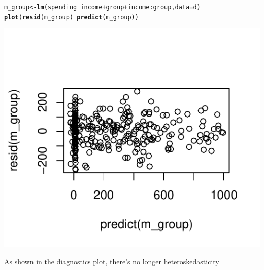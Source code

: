 \documentclass{article}\usepackage[]{graphicx}\usepackage[]{color}
\makeatletter
\def\maxwidth{ %
  \ifdim\Gin@nat@width>\linewidth
    \linewidth
  \else
    \Gin@nat@width
  \fi
}
\newcommand{\hlopt}[1]{\textcolor[rgb]{0,0,0}{#1}}%
\newcommand{\hlstd}[1]{\textcolor[rgb]{0.345,0.345,0.345}{#1}}%
\newcommand{\hlkwb}[1]{\textcolor[rgb]{0.69,0.353,0.396}{#1}}%
\newcommand{\hlkwc}[1]{\textcolor[rgb]{0.333,0.667,0.333}{#1}}%
\newcommand{\hlkwd}[1]{\textcolor[rgb]{0.737,0.353,0.396}{\textbf{#1}}}%
\newenvironment{kframe}{%
 \def\at@end@of@kframe{}%
 \ifinner\ifhmode%
  \def\at@end@of@kframe{\end{minipage}}%
  \begin{minipage}{\columnwidth}%
 \fi\fi%
 \def\FrameCommand##1{\hskip\@totalleftmargin \hskip-\fboxsep
 \colorbox{shadecolor}{##1}\hskip-\fboxsep
     \hskip-\linewidth \hskip-\@totalleftmargin \hskip\columnwidth}%
 \MakeFramed {\advance\hsize-\width
   \@totalleftmargin\z@ \linewidth\hsize
   \@setminipage}}%
 {\par\unskip\endMakeFramed%
 \at@end@of@kframe}
\newenvironment{knitrout}{}{} %
\makeatother
\begin{document}
\begin{knitrout}
\color{fgcolor}\begin{kframe}
\begin{alltt}
\hlstd{m_group} \hlkwb{<-} \hlkwd{lm}\hlstd{(spending} \hlopt{~} \hlstd{income} \hlopt{+} \hlstd{group} \hlopt{+} \hlstd{income}\hlopt{:}\hlstd{group,} \hlkwc{data} \hlstd{= d)}
\hlkwd{plot}\hlstd{(}\hlkwd{resid}\hlstd{(m_group)} \hlopt{~} \hlkwd{predict}\hlstd{(m_group))}
\end{alltt}
\end{kframe}
\includegraphics[width=\maxwidth]{figure/unnamed-chunk-9-1} 

\end{knitrout}

As shown in the diagnostics plot, there's no longer heteroskedasticity
\end{document}
